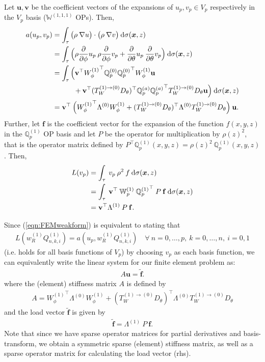 \documentclass[11pt, oneside]{article}   	%
\newcommand{\genjac}{R}
\newcommand{\genjacw}{w_\genjac}
\newcommand{\element}{\tau}
\newcommand{\bigW}{\mathbb{W}}
\newcommand{\bigWiii}{{\mathbb{W}^{(1,1,1)}}}
\newcommand{\scop}{Q}
\newcommand{\scopnki}{\scop_{n,k,i}}
\newcommand{\bigscop}{{\mathbb{Q}}}
\newcommand{\bigscopa}{\bigscop^{(a)}}
\newcommand{\ppphi}{\frac{\partial}{\partial \phi}}
\newcommand{\rhoppphi}{\rho \ppphi}
\newcommand{\pptheta}{\frac{\partial}{\partial \theta}}
\newcommand{\scopnkii}{\scopnki^{(1)}}
\newcommand{\bigscopi}{\bigscop^{(1)}}
\newcommand{\bigscopo}{\bigscop^{(0)}}
\begin{document}
Let $\mathbf{u}, \mathbf{v}$ be the coefficient vectors of the expansions of $u_p, v_p \in V_p$ respectively in the $V_p$ basis ($\bigWiii$ OPs). Then,
\begin{align*}
	a(u_p,v_p) &= \int_\element \big(\rho \: \nabla u\big) \cdot \big(\rho \: \nabla v\big) \: \D \sigma(\bm{x}, z) \\
	&= \int_\element \Big( \rhoppphi u_p \: \rhoppphi v_p + \pptheta u_p \: \pptheta v_p \Big) \: \D \sigma(\bm{x}, z) \\
	&= \int_\element \Big( \mathbf{v}^\top {W_\phi^{(1)}}^\top \bigscopo_p {\bigscopo_p}^\top W_\phi^{(1)} \mathbf{u} \nonumber \\
					& \quad \quad \quad + \mathbf{v}^\top ({T_W^{(1)\to(0)} D_\theta})^\top \bigscopa_p {\bigscopa_p}^\top T_W^{(1)\to(0)} D_\theta \mathbf{u}  \Big) \: \D \sigma(\bm{x}, z) \\
	&= \mathbf{v}^\top \: \Big( {W_\phi^{(1)}}^\top \Lambda^{(0)}  W_\phi^{(1)} + ({T_W^{(1)\to(0)} D_\theta})^\top \Lambda^{(0)} T_W^{(1)\to(0)} D_\theta \Big) \: \mathbf{u}.
\end{align*}
Further, let $\mathbf{f}$ is the coefficient vector for the expansion of the function $f(x,y,z)$ in the $\bigscopi_p$ OP basis and let $P$ be the operator for multiplication by $\rho(z)^2$, that is the operator matrix defined by $P^\top \bigscopi_p(x,y,z) = \rho(z)^2 \: \bigscopi_p(x,y,z)$. Then,
\begin{align*}
	L(v_p) &= \int_\element \: v_p \: \rho^2 \: f \: \D \sigma(\bm{x}, z) \\
	&= \int_\element \: \mathbf{v}^\top \: \bigW_p^{(1)} \: {\bigscopi_p}^\top \: P \: \mathbf{f} \: \D \sigma(\bm{x}, z) \\	
	&= \mathbf{v}^\top \Lambda^{(1)} \: P \: \mathbf{f}.
\end{align*}

Since (\ref{eqn:FEMweakform}) is equivalent to stating that
\begin{align*}
	L(\genjacw^{(1)} \scopnkii) = a(u_p, \genjacw^{(1)} \scopnkii) \quad \forall \: n = 0,\dots,p, \: k = 0,\dots,n, \: i = 0,1
\end{align*}
(i.e. holds for all basis functions of $V_p$) by choosing $v_p$ as each basis function, we can equivalently write the linear system for our finite element problem as:
\begin{align*}
	A\mathbf{u} = \tilde{\mathbf{f}}.
\end{align*}
where the (element) stiffness matrix $A$ is defined by 
\begin{align*}
	A =  {W_\phi^{(1)}}^\top \Lambda^{(0)}  W_\phi^{(1)} + ({T_W^{(1)\to(0)} D_\theta})^\top \Lambda^{(0)} T_W^{(1)\to(0)} D_\theta
\end{align*}
and the load vector $\tilde{\mathbf{f}}$ is given by 
\begin{align*}
	\tilde{\mathbf{f}} = \Lambda^{(1)} \: P \: \mathbf{f}.
\end{align*}
Note that since we have sparse operator matrices for partial derivatives and basis-transform, we obtain a symmetric sparse (element) stiffness matrix, as well as a sparse operator matrix for calculating the load vector (rhs).




\end{document}
